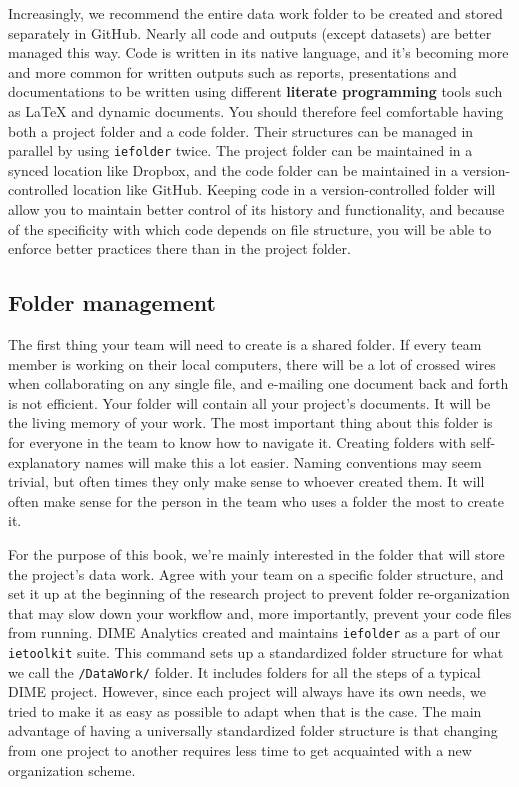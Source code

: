 Increasingly, we recommend the entire data work folder
to be created and stored separately in GitHub.
Nearly all code and outputs (except datasets) are better managed this way.
Code is written in its native language,
and it's becoming more and more common for written outputs such as reports,
presentations and documentations to be written using different \textbf{literate programming}
tools such as {\LaTeX} and dynamic documents.
You should therefore feel comfortable having both a project folder and a code folder.
Their structures can be managed in parallel by using \texttt{iefolder} twice.
The project folder can be maintained in a synced location like Dropbox,
and the code folder can be maintained in a version-controlled location like GitHub.
Keeping code in a version-controlled folder will allow you
to maintain better control of its history and functionality,
and because of the specificity with which code depends on file structure,
you will be able to enforce better practices there than in the project folder.


\subsection{Folder management}

The first thing your team will need to create is a shared folder.
If every team member is working on their local computers,
there will be a lot of crossed wires when collaborating on any single file,
and e-mailing one document back and forth is not efficient.
Your folder will contain all your project's documents.
It will be the living memory of your work.
The most important thing about this folder is for everyone in the team to know how to navigate it.
Creating folders with self-explanatory names will make this a lot easier.
Naming conventions may seem trivial,
but often times they only make sense to whoever created them.
It will often make sense for the person in the team who uses a folder the most to create it.

For the purpose of this book,
we're mainly interested in the folder that will store the project's data work.
Agree with your team on a specific folder structure, and
set it up at the beginning of the research project
to prevent folder re-organization that may slow down your workflow and,
more importantly, prevent your code files from running.
DIME Analytics created and maintains
\texttt{iefolder}
as a part of our \texttt{ietoolkit} suite.
This command sets up a standardized folder structure for what we call the \texttt{/DataWork/} folder.
It includes folders for all the steps of a typical DIME project.
However, since each project will always have its own needs,
we tried to make it as easy as possible to adapt when that is the case.
The main advantage of having a universally standardized folder structure
is that changing from one project to another requires less
time to get acquainted with a new organization scheme.

